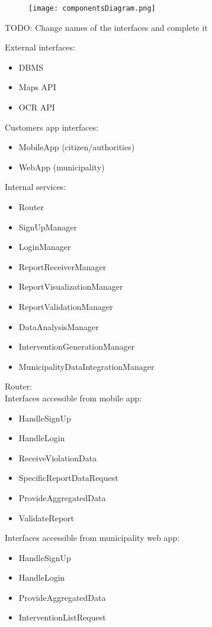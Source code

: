 \begin{figure}[H]
	\texttt{[image: componentsDiagram.png]}
\end{figure}
TODO: Change names of the interfaces and complete it

External interfaces:
\begin{itemize}
	\item DBMS
	\item Maps API
	\item OCR API
\end{itemize}

Customers app interfaces:
\begin{itemize}
	\item MobileApp (citizen/authorities)
	\item WebApp (municipality)
\end{itemize}

Internal services:
\begin{itemize}
	\item Router
	\item SignUpManager
	\item LoginManager
	\item ReportReceiverManager
	\item ReportVisualizationManager
	\item ReportValidationManager
	\item DataAnalysisManager
	\item InterventionGenerationManager
	\item MunicipalityDataIntegrationManager
\end{itemize}

\bigskip
Router:\\
Interfaces accessible from mobile app:
\begin{itemize}
	\item HandleSignUp
	\item HandleLogin
	\item ReceiveViolationData
	\item SpecificReportDataRequest
	\item ProvideAggregatedData
	\item ValidateReport
\end{itemize}
Interfaces accessible from municipality web app:
\begin{itemize}
	\item HandleSignUp
	\item HandleLogin
	\item ProvideAggregatedData
	\item InterventionListRequest 
\end{itemize}

